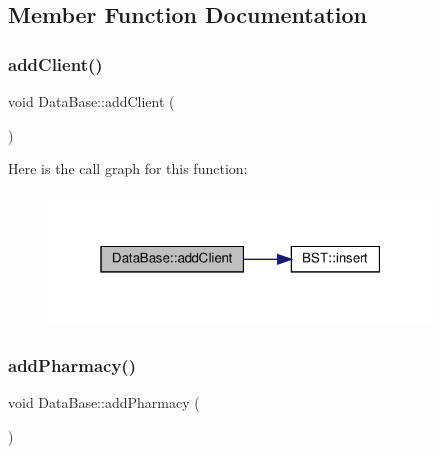 \subsection{Member Function Documentation}
\mbox{\label{classDataBase_a1eebe53a8f3c83af5d75d3a83590ca01}} 
\subsubsection{\texorpdfstring{add\+Client()}{addClient()}}
{\footnotesize\ttfamily void Data\+Base\+::add\+Client (\begin{DoxyParamCaption}{ }\end{DoxyParamCaption})}

Here is the call graph for this function\+:\nopagebreak
\begin{figure}[H]
\begin{center}
\leavevmode
\includegraphics[width=289pt]{classDataBase_a1eebe53a8f3c83af5d75d3a83590ca01_cgraph}
\end{center}
\end{figure}
\mbox{\label{classDataBase_a4a6fca7606a5734e623a3d8ea7c00fa4}} 
\subsubsection{\texorpdfstring{add\+Pharmacy()}{addPharmacy()}}
{\footnotesize\ttfamily void Data\+Base\+::add\+Pharmacy (\begin{DoxyParamCaption}{ }\end{DoxyParamCaption})}

\mbox{\label{classDataBase_a82e38546b8cb54beffd3185a13a838aa}} 
